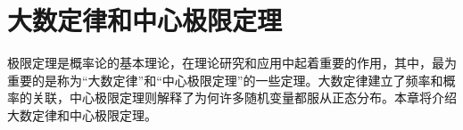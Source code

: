 \chapter{大数定律和中心极限定理}
极限定理是概率论的基本理论，在理论研究和应用中起着重要的作用，其中，最为重要的是称为“大数定律”和“中心极限定理”的一些定理。大数定律建立了频率和概率的关联，中心极限定理则解释了为何许多随机变量都服从正态分布。本章将介绍大数定律和中心极限定理。


